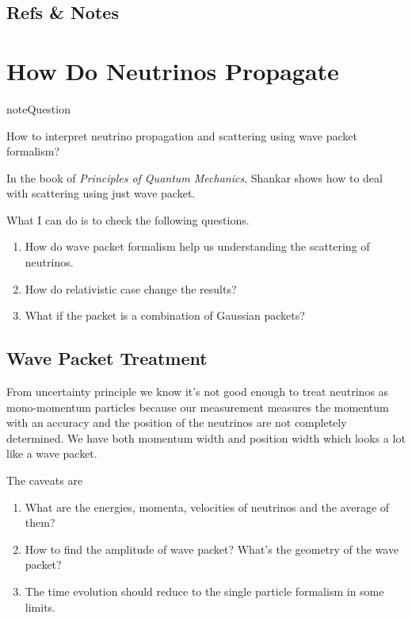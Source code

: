 \documentclass[letterpaper,12pt,english]{sphinxmanual}
\begin{document}
\section{Refs \& Notes}
\label{experiments:refs-notes}

\chapter{How Do Neutrinos Propagate}
\label{propagation::doc}\label{propagation:how-do-neutrinos-propagate}
\begin{notice}{note}{Question}

How to interpret neutrino propagation and scattering using wave packet formalism?
\end{notice}

In the book of \emph{Principles of Quantum Mechanics}, Shankar shows how to deal with scattering using just wave packet.

What I can do is to check the following questions.
\begin{enumerate}
\item {} 
How do wave packet formalism help us understanding the scattering of neutrinos.

\item {} 
How do relativistic case change the results?

\item {} 
What if the packet is a combination of Gaussian packets?

\end{enumerate}


\section{Wave Packet Treatment}
\label{propagation:wave-packet-treatment}\label{propagation:index-0}
From uncertainty principle we know it's not good enough to treat neutrinos as mono-momentum particles because our measurement measures the momentum with an accuracy and the position of the neutrinos are not completely determined. We have both momentum width and position width which looks a lot like a wave packet.

The caveats are
\begin{enumerate}
\item {} 
What are the energies, momenta, velocities of neutrinos and the average of them?

\item {} 
How to find the amplitude of wave packet? What's the geometry of the wave packet?

\item {} 
The time evolution should reduce to the single particle formalism in some limits.

\end{enumerate}
\end{document}
